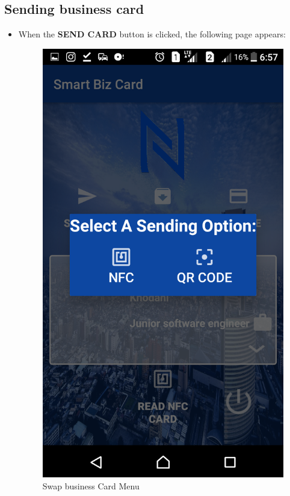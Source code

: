 \documentclass[english]{article}
\begin{document}
	\subsection{Sending business card}
		\begin{itemize}
		\item When the \textbf{SEND CARD} button is clicked, the following page appears:
		
		\begin{figure}[H]
			\centering
			\includegraphics[scale=0.3]{swap_info.png}
			\caption{Swap business Card Menu}
			\label{figure: 4}
		\end{figure}
		

\end{itemize}
\end{document}
